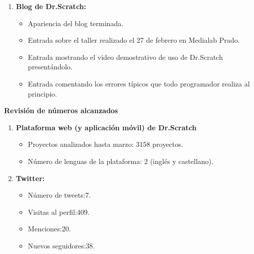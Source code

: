 \documentclass[a4paper,12pt]{letter}
\begin{document}
\begin{letter}
\begin{enumerate}
    \item{\textbf {Blog de Dr.Scratch:}}
    \begin{itemize}
        \item {Apariencia del blog terminada.}
        \item {Entrada sobre el taller realizado el 27 de febrero en Medialab Prado.}
        \item {Entrada mostrando el video demostrativo de uso de Dr.Scratch presentándolo.}
        \item {Entrada comentando los errores típicos que todo programador realiza al principio.}
    \end{itemize}

\end{enumerate}

\vspace{0.75cm}
\textbf{{\LARGE Revisión de números alcanzados}}
\vspace{0.5cm}

\begin{enumerate}
    \item{\textbf {Plataforma web (y aplicación móvil) de Dr.Scratch}}
    \begin{itemize}
        \item {Proyectos analizados hasta marzo: 3158 proyectos.}
        \item {Número de lenguas de la plataforma: 2 (inglés y castellano).}
    \end{itemize}

    \item{\textbf {Twitter:}}
    \begin{itemize}
        \item {Número de tweets:7.}
        \item {Visitas al perfil:409.}
        \item {Menciones:20.}
        \item {Nuevos seguidores:38.}

    \end{itemize}

\end{enumerate}

\end{letter}
\end{document}

